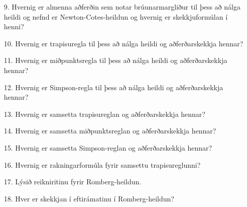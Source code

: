 \documentclass[icelandic,a4paper,12pt]{article}
\begin{document}
  \begin{enumerate}
  \item [9.] Hvernig er almenna aðferðin sem notar brúunarmargliður til þess
    að nálga heildi og nefnd er Newton-Cotes-heildun og hvernig er
    skekkjuformúlan í henni? 
  \item [10.] Hvernig er trapisuregla til þess að nálga heildi og
   aðferðarskekkja hennar?
  \item [11.] Hvernig er miðpunktsregla til þess að nálga heildi og
   aðferðarskekkja hennar? 
  \item [12.] Hvernig er Simpson-regla til þess að nálga heildi og
    aðferðarskekkja hennar?
  \item [13.] Hvernig er samsetta trapisureglan og 
    aðferðarskekkja hennar?
  \item [14.] Hvernig er samsetta miðpunktsreglan og 
 aðferðarskekkja hennar? 
  \item [15.]  Hvernig er samsetta Simpson-reglan og 
aðferðarskekkja hennar?
  \item [16.] Hvernig er rakningarformúla fyrir samsettu trapisureglunni?
  \item [17.] Lýsið reikniritinu fyrir Romberg-heildun.
  \item [18.] Hver er skekkjan í eftirámatinu í Romberg-heildun?
   \end{enumerate}
\end{document}
